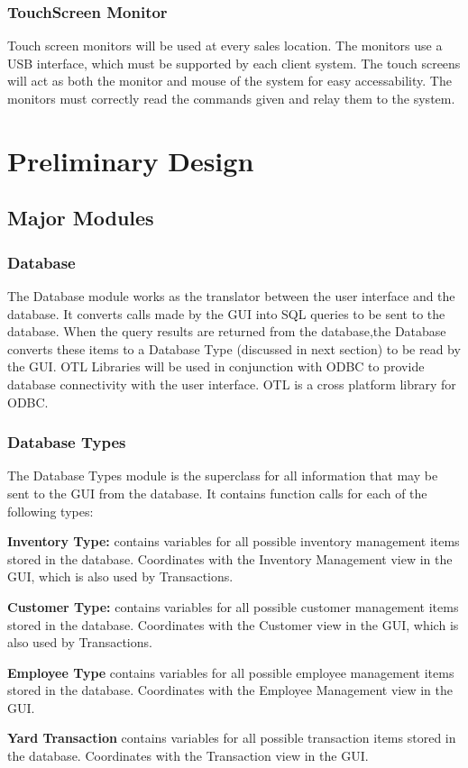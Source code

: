 \documentclass{report}
\begin{document}
    \subsubsection{TouchScreen Monitor}
    Touch screen monitors will be used at every sales location.
    The monitors use a USB interface, which must be supported by
    each client system.  The touch screens will act as both the
    monitor and mouse of the system for easy accessability.  The
    monitors must correctly read the commands given and relay them
    to the system.

\section{Preliminary Design}

    \subsection{Major Modules}

        \subsubsection{Database}
        The Database module works as the translator between
        the user interface and the database.  It converts calls
        made by the GUI into SQL queries to be sent to the
        database.  When the query results are returned from the
        database,the Database converts these items to a
        Database Type (discussed in next section) to be read by the
        GUI. OTL Libraries will be used in conjunction with ODBC to
	provide database connectivity with the user interface. OTL is
	a cross platform library for ODBC.
        \subsubsection{Database Types}
        The Database Types module is the superclass for all information that
        may be sent to the GUI from the database.  It contains
        function calls for each of the following types:
        \begin{list}{}
            \item{{\bf Inventory Type:} contains variables for all
            possible inventory management items stored in the
            database.  Coordinates with the Inventory Management
            view in the GUI, which is also used by Transactions.}
            \item{{\bf Customer Type:} contains variables for
            all possible customer management items stored in the database.
            Coordinates with the Customer view in the GUI,
            which is also used by Transactions.}
            \item{{\bf Employee Type} contains variables for
            all possible employee management items stored in the
            database.  Coordinates with the Employee Management
            view in the GUI.}
            \item{{\bf Yard Transaction} contains variables for all
            possible transaction items stored in the database.
            Coordinates with the Transaction view in the GUI.}
        \end{list}{}
\end{document}
